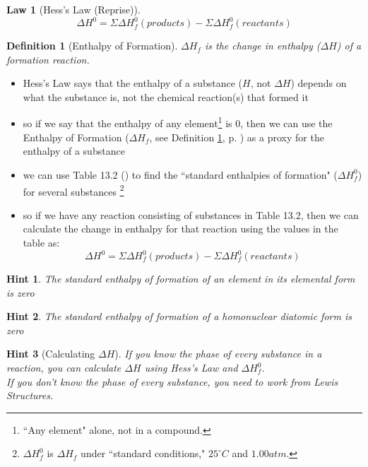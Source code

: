 \documentclass[11pt, oneside]{article}   	%
\newtheorem{definition}{Definition}
\newtheorem{law}{Law}
\newtheorem{hint}{Hint}
\begin{document}
\begin{law}[Hess's Law (Reprise)]\label{def:law-hess-math}
$$\Delta H^{0} = \Sigma \Delta H^{0}_f (products) - \Sigma \Delta H^{0}_f (reactants) $$ 
\end{law}

\begin{definition}[Enthalpy of Formation]\label{def:enthalpy-formation}
$\Delta H_f$ is the change in enthalpy ($\Delta H$) of a formation reaction.
\end{definition}


\begin{itemize}
\item Hess's Law says that the enthalpy of a substance ($H$, not $\Delta H$) depends on what the substance is, not the chemical reaction(s) that formed it
\item so if we say that the enthalpy of any element\footnote{``Any element" alone, not in a compound.} is $0$, then we can use the Enthalpy of Formation ($\Delta H_f$, see Definition \ref{def:enthalpy-formation}, p. \pageref{def:enthalpy-formation}) as a proxy for the enthalpy of a substance
\item we can use Table 13.2 (\cite[p. 431]{wile-chem-2}) to find the ``standard enthalpies of formation" ($\Delta H_f  ^{0}$) for several substances
\footnote{$\Delta H_f  ^{0}$ is $\Delta H_f$ under ``standard conditions," $25 ^{\circ} C$ and $1.00 atm$.}
\item so if we have any reaction consisting of substances in Table 13.2, then we can calculate the change in enthalpy for that reaction using the values in the table as:
$$\Delta H^{0} = \Sigma \Delta H^{0}_f (products) - \Sigma \Delta H^{0}_f (reactants) $$ 
\end{itemize}


\begin{hint}\label{enthalpy-formation-element}
The standard enthalpy of formation of an element in its elemental form is zero
\end{hint}

\begin{hint}\label{enthalpy-formation-diatomic}
The standard enthalpy of formation of a  homonuclear diatomic form is zero
\end{hint}

\begin{hint}[Calculating $\Delta H$]\label{hint:calculating-enthalpy-changes}
If you know the phase of every substance in a reaction, you can calculate $\Delta H$ using Hess's Law and $\Delta H_f  ^{0}$.\\
If you don't know the phase of every substance, you need to work from Lewis Structures.
\end{hint}
\end{document}
